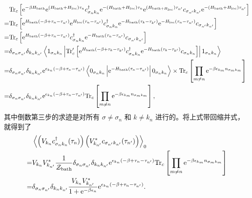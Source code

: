 \begin{equation}
    \begin{aligned}
        &\mathrm{Tr}_c \left[ \mathrm{e}^{-\beta H_{\mathrm{bath}}}\mathrm{e}^{(H_{\mathrm{bath}}+H_{\mathrm{loc}})\tau_n}c_{\sigma_n k_n}^\dagger \mathrm{e}^{-(H_{\mathrm{bath}}+H_{\mathrm{loc}})\tau_n}\mathrm{e}^{(H_{\mathrm{bath}+H_{\mathrm{loc}}})\tau_{n'}}c_{\sigma_{n'}k_{n'}}\mathrm{e}^{-(H_{\mathrm{bath}}+H_{\mathrm{loc}})\tau_{n'}} \right]\\
        =& \mathrm{Tr}_c\left[ \mathrm{e}^{H_{\mathrm{bath}}(-\beta+\tau_n-\tau_{n'})}\mathrm{e}^{H_{\mathrm{loc}}(\tau_n-\tau_{n'})}c_{\sigma_nk_{n}}^\dagger \mathrm{e}^{-H_{\mathrm{bath}}(\tau_k-\tau_{k'})}\mathrm{e}^{-H_{\mathrm{loc}}(\tau_n-\tau_{n'})}c_{\sigma_{n'}k_{n'}} \right]\\
        =&  \mathrm{Tr}_c\left[ \mathrm{e}^{H_{\mathrm{bath}}(-\beta+\tau_n-\tau_{n'})}c_{\sigma_nk_n}^\dagger \mathrm{e}^{-H_{\mathrm{bath}}(\tau_n-\tau_{n'})}c_{\sigma_{n'}k_{n'}} \right]\\
        =&\delta_{\sigma_n\sigma_{n'}}\delta_{k_nk_{n'}}\left\langle 1_{\sigma_nk_n} \left| \mathrm{Tr}_{c}'\left[ \mathrm{e}^{H_{\mathrm{bath}}(-\beta+\tau_k-\tau_{k'})}c_{\sigma_nk_n}^\dagger \mathrm{e}^{-H_{\mathrm{bath}}(\tau_k-\tau_{k'})}c_{\sigma_nk_n} \right] \right| 1_{\sigma_nk_n}  \right\rangle\\
        =& \delta_{\sigma_n\sigma_{n'}}\delta_{k_nk_{n'}}\mathrm{e}^{\epsilon_{k_n}(-\beta+\tau_n-\tau_{n'})}\left\langle 0_{\sigma_nk_n}\left| \mathrm{e}^{-H_{\mathrm{bath}}(\tau_n-\tau_{n'})} \right| 0_{\sigma_n k_n} \right\rangle\times \mathrm{Tr}_c\left[\prod_{m\ne n}\mathrm{e}^{-\beta\epsilon_{k_m}n_{\sigma_mk_m}}\right] \\
        =& \delta_{\sigma_n\sigma_{n'}}\delta_{k_nk_{n'}}\mathrm{e}^{\epsilon_{k_n}(-\beta+\tau_n-\tau_{n'})}\mathrm{Tr}_c\left[\prod_{m\ne n}\mathrm{e}^{-\beta\epsilon_{k_m}n_{\sigma_mk_m}}\right],
    \end{aligned}
\end{equation}
其中倒数第三步的求迹是对所有 $\sigma\ne \sigma_n$ 和 $k\ne k_n$ 进行的。将上式带回缩并式，就得到了 
\begin{equation}
    \begin{aligned}
        &\left\langle\left( V_{k_n}c_{\sigma_n k_n}^\dagger (\tau_n) \right) \left( V_{k_{n'}}^* c_{\sigma_{n'}k_{n'}}(\tau_{n'}) \right)\right\rangle_0\\
        =&V_{k_n}V_{k_{n'}}^*\frac{1}{\mathcal{Z}_{\mathrm{bath}}}\delta_{\sigma_n\sigma_{n'}}\delta_{k_nk_{n'}}\mathrm{e}^{\epsilon_{k_n}(-\beta+\tau_n-\tau_{n'})}\mathrm{Tr}_c\left[\prod_{m\ne n}\mathrm{e}^{-\beta\epsilon_{k_m}n_{\sigma_mk_m}}\right]\\
        =&\delta_{\sigma_n\sigma_{n'}}\delta_{k_nk_{n'}}\frac{V_{k_n}V_{k_{n'}}^*}{1+\mathrm{e}^{-\beta\epsilon_n}}\mathrm{e}^{\epsilon_{k_n}(-\beta+\tau_n-\tau_{n'})}.
    \end{aligned}
\end{equation}
